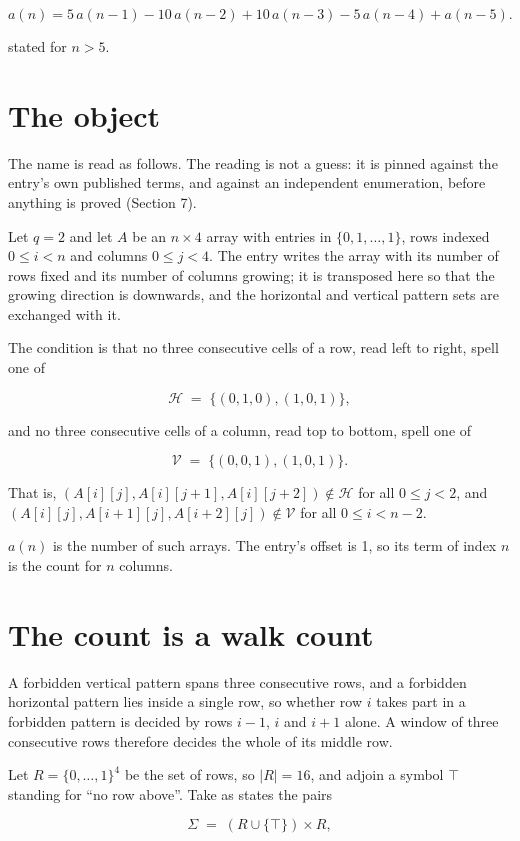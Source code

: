 \documentclass[11pt]{article}
\theoremstyle{definition}
\begin{document}
\[a(n) = 5\,a(n-1) - 10\,a(n-2) + 10\,a(n-3) - 5\,a(n-4) + a(n-5).\]

stated for $n > 5$.

\section{The object}

The name is read as follows. The reading is not a guess: it is pinned against the entry's own published terms, and against an independent enumeration, before anything is proved (Section 7).

Let $q = 2$ and let $A$ be an $n \times 4$ array with entries in $\{0,1,\dots,1\}$, rows indexed $0 \le i < n$ and columns $0 \le j < 4$. The entry writes the array with its number of rows fixed and its number of columns growing; it is transposed here so that the growing direction is downwards, and the horizontal and vertical pattern sets are exchanged with it.

The condition is that no three consecutive cells of a row, read left to right, spell one of

\[\mathcal{H} \;=\; \{(0,1,0), (1,0,1)\},\]

and no three consecutive cells of a column, read top to bottom, spell one of

\[\mathcal{V} \;=\; \{(0,0,1), (1,0,1)\}.\]

That is, $(A[i][j],A[i][j{+}1],A[i][j{+}2]) \notin \mathcal{H}$ for all $0 \le j < 2$, and $(A[i][j],A[i{+}1][j],A[i{+}2][j]) \notin \mathcal{V}$ for all $0 \le i < n-2$.

$a(n)$ is the number of such arrays. The entry's offset is 1, so its term of index $n$ is the count for $n$ columns.

\section{The count is a walk count}

A forbidden vertical pattern spans three consecutive rows, and a forbidden horizontal pattern lies inside a single row, so whether row $i$ takes part in a forbidden pattern is decided by rows $i-1$, $i$ and $i+1$ alone. A window of three consecutive rows therefore decides the whole of its middle row.

Let $R = \{0,\dots,1\}^{4}$ be the set of rows, so $|R| = 16$, and adjoin a symbol $\top$ standing for ``no row above''. Take as states the pairs

\[\Sigma \;=\; (R \cup \{\top\}) \times R,\]
\end{document}
